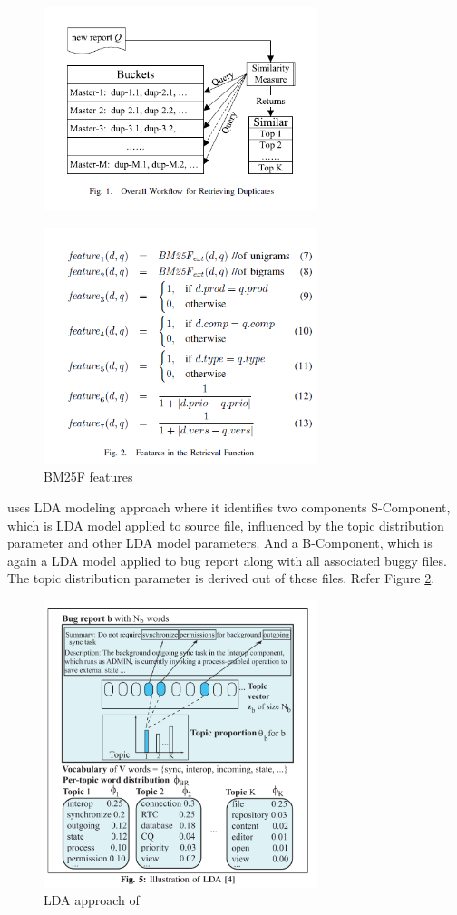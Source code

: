 \documentclass[]{sig-alternate-05-2015}
\begin{document}
\begin{figure}
\includegraphics[width=8cm]{overallworkflow.png}
\end{figure}
\begin{figure}[h]
\includegraphics[width=8cm]{featuresinretrievalfunction.png}
\caption{BM25F features}
\label{fig:read3}
\end{figure}
\cite{Nguyen} uses LDA modeling approach where it identifies two components S-Component, which is LDA model applied to source file, influenced by the topic distribution parameter and other LDA model parameters. And a B-Component, which is again a LDA model applied to bug report along with all associated buggy files. The topic distribution parameter is derived out of these files. Refer Figure \ref{fig:2lda}.
\begin{figure}[h]
\includegraphics[width=8cm]{2lda.png}
\caption{LDA approach of \cite{Nguyen}}
\label{fig:2lda}
\end{figure}
\end{document}
